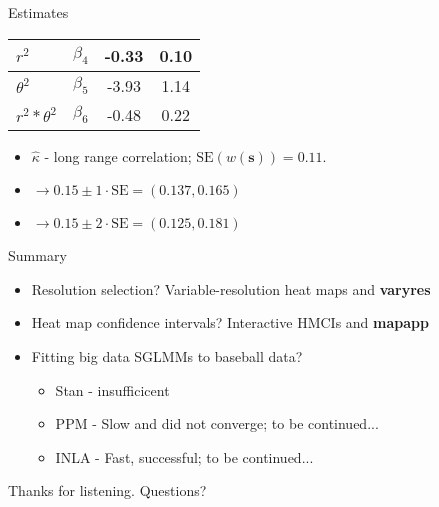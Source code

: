 \documentclass{beamer}
\begin{document}
\begin{frame}{Estimates}
\begin{table}
{\begin{tabular}{| l | c | c | c |}
$r^{2}$           & $\beta_{4}$ & -0.33 & 0.10 \\ \hline
$\theta^{2}$      & $\beta_{5}$ & -3.93 & 1.14 \\ \hline
$r^{2}*\theta^{2}$& $\beta_{6}$ & -0.48 & 0.22 \\ \hline
\end{tabular}
}
\end{table}
\begin{itemize}
\item $\hat{\kappa}$ - long range correlation; $\text{SE}(w(\pmb{s})) = 0.11$. 
\item $\rightarrow 0.15 \pm 1 \cdot \text{SE} = (0.137, 0.165)$
\item $\rightarrow 0.15 \pm 2 \cdot \text{SE} = (0.125, 0.181)$
\end{itemize}
\end{frame}

\begin{frame}{Summary}
\begin{itemize}
\item Resolution selection? Variable-resolution heat maps and {\bf varyres}
\item Heat map confidence intervals? Interactive HMCIs and {\bf mapapp}
\item Fitting big data SGLMMs to baseball data?
  \begin{itemize}
  \item Stan - insufficicent
  \item PPM - Slow and did not converge; to be continued...
  \item INLA - Fast, successful; to be continued...
  \end{itemize}
\end{itemize}
\end{frame}


% 
% 
% 
\begin{frame}{}
\begin{center}
\Huge{Thanks for listening.
Questions?}
\end{center}
\end{frame}


\end{document}
